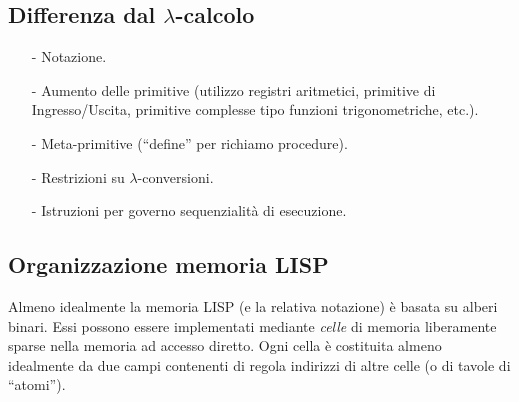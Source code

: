 \documentclass{book}
\newcommand*{\lbc}{$\lambda$-cal\-co\-lo}
\begin{document}
\subsection{Differenza dal \lbc}
\begin{itemize}
\item[-]Notazione.
\item[-]Aumento delle primitive (utilizzo registri aritmetici, primitive di
Ingresso/Uscita, primitive complesse tipo funzioni trigonometriche, etc.).
\item[-]Meta-primitive (``define'' per richiamo procedure).
\item[-]Restrizioni su $\lambda$-conversioni.
\item[-]Istruzioni per governo sequenzialit\`a di esecuzione.
\end{itemize}

\subsection{Organizzazione memoria LISP}
Almeno idealmente la memoria LISP (e la relativa notazione) \`e basata su 
alberi binari. Essi possono essere implementati mediante \emph{celle} di 
memoria liberamente sparse nella memoria ad accesso diretto. Ogni cella \`e 
costituita almeno idealmente da due campi contenenti di regola indirizzi di 
altre celle (o di tavole di ``atomi'').
\end{document}
